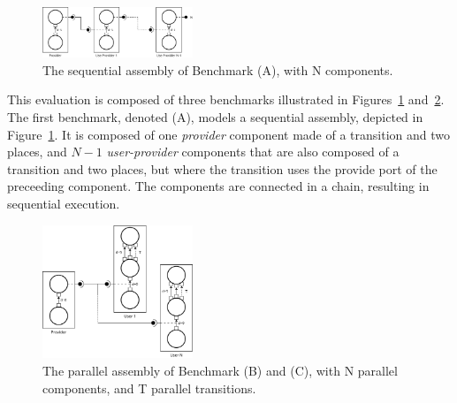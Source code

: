 
\begin{figure}[h]
  \begin{center}
    \includegraphics[width=0.4\textwidth]{./images/seq.pdf}
    \caption{The \mad sequential assembly of Benchmark (A), with N components. }
    \label{fig:seq}
  \end{center}
\end{figure}

This evaluation is composed of three benchmarks illustrated in
Figures~\ref{fig:seq} and~\ref{fig:par}.
The first benchmark, denoted (A), models a sequential \mad assembly,
depicted in Figure~\ref{fig:seq}. It is composed of one
\emph{provider} component made of a transition and two places, and
$N-1$ \emph{user-provider} components that are also composed of a
transition and two places, but where the transition uses the provide
port of the preceeding component. The components are connected in
a chain, resulting in sequential execution.

\begin{figure}[h]
  \begin{center}
    \includegraphics[width=0.4\textwidth]{./images/par.pdf}
    \caption{The \mad parallel assembly of Benchmark (B) and (C), with N parallel components, and T parallel transitions. }
    \label{fig:par}
  \end{center}
\end{figure}


